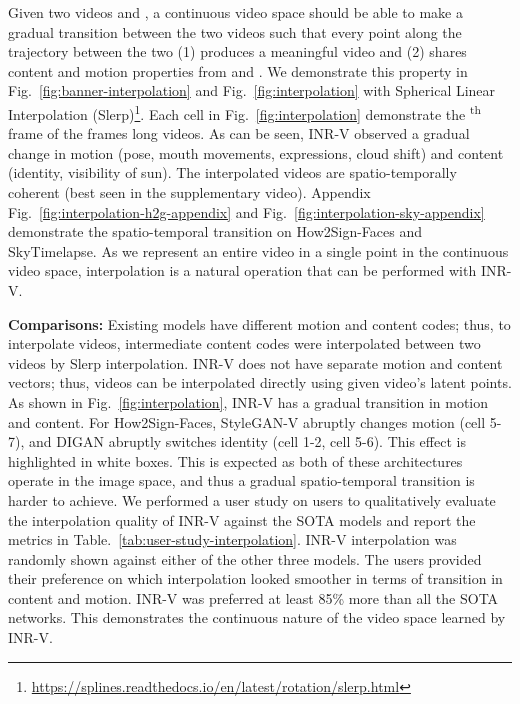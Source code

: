 \documentclass[10pt]{article} \usepackage[accepted]{tmlr}
\begin{document}
Given two videos  and , a continuous video space should be able to make a gradual transition between the two videos such that every point along the trajectory between the two (1) produces a meaningful video and (2) shares content and motion properties from  and . We demonstrate this property in Fig.~\ref{fig:banner-interpolation} and Fig.~\ref{fig:interpolation} with Spherical Linear Interpolation (Slerp)\def\thefootnote{}\footnote{\href{https://splines.readthedocs.io/en/latest/rotation/slerp.html}{https://splines.readthedocs.io/en/latest/rotation/slerp.html}}. Each cell in Fig.~\ref{fig:interpolation} demonstrate the \textsuperscript{th} frame of the  frames long videos. 
As can be seen, INR-V observed a gradual change in motion (pose, mouth movements, expressions, cloud shift) and content (identity, visibility of sun). The interpolated videos are spatio-temporally coherent (best seen in the supplementary video). Appendix Fig.~\ref{fig:interpolation-h2g-appendix} and Fig.~\ref{fig:interpolation-sky-appendix} demonstrate the spatio-temporal transition on How2Sign-Faces and SkyTimelapse. As we represent an entire video in a single point in the continuous video space, interpolation is a natural operation that can be performed with INR-V. 

\textbf{Comparisons: } Existing models have different motion and content codes; thus, to interpolate videos, intermediate content codes were interpolated between two videos by Slerp interpolation. INR-V does not have separate motion and content vectors; thus, videos can be interpolated directly using given video's latent points. As shown in Fig.~\ref{fig:interpolation}, INR-V has a gradual transition in motion and content. For How2Sign-Faces, StyleGAN-V abruptly changes motion (cell 5-7), and DIGAN abruptly switches identity (cell 1-2, cell 5-6). This effect is highlighted in white boxes. This is expected as both of these architectures operate in the image space, and thus a gradual spatio-temporal transition is harder to achieve. We performed a user study on  users to qualitatively evaluate the interpolation quality of INR-V against the SOTA models and report the metrics in Table.~\ref{tab:user-study-interpolation}. 
INR-V interpolation was randomly shown against either of the other three models. 
The users provided their preference on which interpolation looked smoother in terms of transition in content and motion. INR-V was preferred at least 85\% more than all the SOTA networks. This demonstrates the continuous nature of the video space learned by INR-V. 
\end{document}
